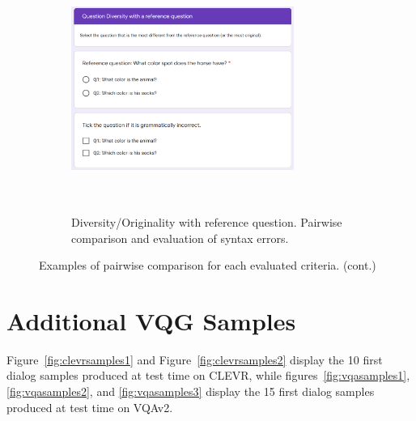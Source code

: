 \documentclass{article}
\begin{document}
\begin{figure}\ContinuedFloat
    \begin{subfigure}{\textwidth}
\centering
\includegraphics[clip,width=0.8\textwidth,height=8cm]{./diversity_ex1.png}
\caption{Diversity/Originality with reference question. Pairwise comparison and evaluation of syntax errors.}
\end{subfigure}
    \caption{Examples of pairwise comparison for each evaluated criteria. (cont.)}
\end{figure}

\FloatBarrier
\section{Additional VQG Samples}
\label{app:samples}

Figure~\ref{fig:clevrsamples1} and Figure~\ref{fig:clevrsamples2} display the 10 first dialog samples produced at test time on CLEVR, while figures~\ref{fig:vqasamples1}, \ref{fig:vqasamples2}, and \ref{fig:vqasamples3} display the 15 first dialog samples produced at test time on VQAv2.
\end{document}
